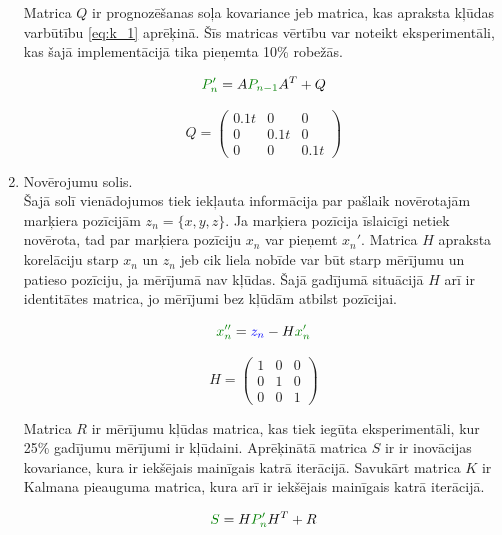 \documentclass[12pt, a4paper, oneside, openright]{article}
\begin{document}
\begin{enumerate}
Matrica $Q$ ir prognozēšanas soļa kovariance jeb matrica, kas apraksta kļūdas varbūtību \ref{eq:k_1} aprēķinā.
Šīs matricas vērtību var noteikt eksperimentāli, kas šajā implementācijā tika pieņemta 10\% robežās. 

\begin{equation}
\textcolor{darkgreen}{P_{n}'} = A \textcolor{darkgreen}{P_{n-1}} A^T + Q
\end{equation}

\begin{equation}
Q = \begin{pmatrix}
0.1 t & 0 & 0\\
0 & 0.1 t & 0\\
0 & 0 & 0.1 t
\end{pmatrix} 
\end{equation}

\item Novērojumu solis. \\
Šajā solī vienādojumos tiek iekļauta informācija par pašlaik novērotajām marķiera pozīcijām $z_n = \{x, y, z\}$. Ja
marķiera pozīcija īslaicīgi netiek novērota, tad par marķiera pozīciju $x_n$ var pieņemt $x_n'$.
Matrica $H$ apraksta korelāciju starp $x_n$ un $z_n$ jeb cik liela nobīde var būt starp mērījumu un patieso pozīciju,
ja mērījumā nav kļūdas.
Šajā gadījumā situācijā $H$ arī ir identitātes matrica, jo mērījumi bez kļūdām atbilst pozīcijai.

\begin{equation}
\textcolor{darkgreen}{x_n''} = \textcolor{blue}{z_{n}} - H \textcolor{darkgreen}{x_{n}'}
\end{equation}

\begin{equation}
H =  \begin{pmatrix}
1 & 0 & 0\\
0 & 1 & 0\\
0 & 0 & 1
\end{pmatrix}
\end{equation}

Matrica $R$ ir mērījumu kļūdas matrica, kas tiek iegūta eksperimentāli, kur 25\% gadījumu mērījumi ir kļūdaini. 
Aprēķinātā matrica $S$ ir ir inovācijas kovariance, kura ir iekšējais mainīgais katrā iterācijā.
Savukārt matrica $K$ ir Kalmana pieauguma matrica, kura arī ir iekšējais mainīgais katrā iterācijā.

\begin{equation}
\textcolor{darkgreen}{S} = H \textcolor{darkgreen}{P_{n}'} H^T + R
\end{equation}


\end{enumerate}
\end{document}
